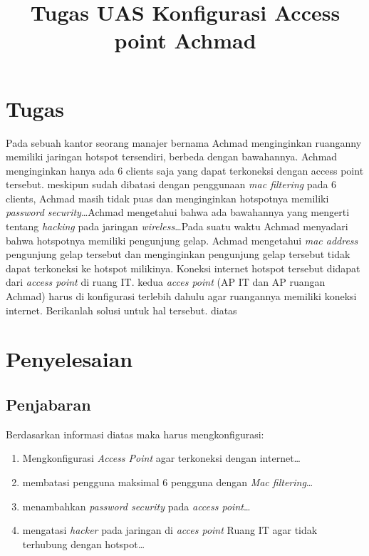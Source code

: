 \documentclass[a4paper, 12pt]{article}
\title{\textbf{Tugas UAS}\linebreak
\textbf{Konfigurasi Access point Achmad}\linebreak}
\date{}
\begin{document}


\clearpage
\section{Tugas}
Pada sebuah kantor seorang manajer bernama Achmad menginginkan ruanganny memiliki jaringan hotspot tersendiri, berbeda dengan bawahannya. Achmad menginginkan hanya ada 6 clients saja yang dapat terkoneksi dengan access point tersebut. meskipun sudah dibatasi dengan penggunaan \textit{mac filtering} pada 6 clients, Achmad masih tidak puas dan menginginkan hotspotnya memiliki \textit{password security}\dots Achmad mengetahui bahwa ada bawahannya yang mengerti tentang \textit{hacking} pada jaringan \textit{wireless}\dots Pada suatu waktu Achmad menyadari bahwa hotspotnya memiliki pengunjung gelap. Achmad mengetahui \textit{mac address} pengunjung gelap tersebut dan menginginkan pengunjung gelap tersebut tidak dapat terkoneksi ke hotspot milikinya. Koneksi internet hotspot tersebut didapat dari \textit{access point} di ruang IT. kedua \textit{acces point} (AP IT dan AP ruangan Achmad) harus di konfigurasi terlebih dahulu agar ruangannya memiliki koneksi internet. Berikanlah solusi untuk hal tersebut. diatas
\section{Penyelesaian}
\subsection{Penjabaran}
Berdasarkan informasi diatas maka harus mengkonfigurasi:
\begin{enumerate}
  \item Mengkonfigurasi \textit{Access Point} agar terkoneksi dengan internet\dots
  \item membatasi pengguna maksimal 6 pengguna dengan \textit{Mac filtering}\dots
  \item menambahkan \textit{password security} pada \textit{access point}\dots
  \item mengatasi \textit{hacker} pada jaringan di \textit{acces point} Ruang IT agar tidak terhubung dengan hotspot\dots
\end{enumerate}
\end{document}
